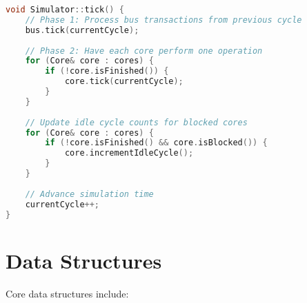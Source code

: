\documentclass[11pt]{article}
\begin{document}
\begin{lstlisting}[language=C++, caption=Simulator tick() Method]
void Simulator::tick() {
    // Phase 1: Process bus transactions from previous cycle
    bus.tick(currentCycle);
    
    // Phase 2: Have each core perform one operation
    for (Core& core : cores) {
        if (!core.isFinished()) {
            core.tick(currentCycle);
        }
    }
    
    // Update idle cycle counts for blocked cores
    for (Core& core : cores) {
        if (!core.isFinished() && core.isBlocked()) {
            core.incrementIdleCycle();
        }
    }
    
    // Advance simulation time
    currentCycle++;
}
\end{lstlisting}

\section{Data Structures}

Core data structures include:
\end{document}
